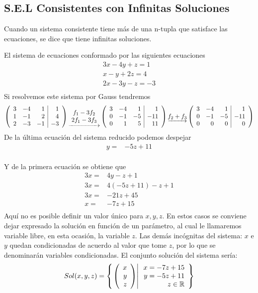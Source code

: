 \subsection{S.E.L Consistentes con Infinitas Soluciones}
Cuando un sistema consistente tiene más de una n-tupla que satisface las ecuaciones, se dice que tiene infinitas soluciones.

\begin{ejemplo}
El sistema de ecuaciones conformado por las siguientes ecuaciones 
\begin{align*}
3x-4y+z=1\\
x-y+2z=4\\
2x-3y-z=-3\\
\end{align*}
Si resolvemos este sistema por Gauss tendremos
\begin{align*}
\reducir{rrr|r}{
3&-4&1&1\\
1&-1&2&4\\
2&-3&-1&-3\\
}
\underrightarrow{\begin{array}{c}
    f_1 - 3f_2\\
    2f_1 - 3f_3
\end{array}}
\reducir{rrr|r}{
3&-4&1&1\\
0&-1&-5&-11\\
0&1&5&11\\
}
\underrightarrow{f_2 + f_3}
\reducir{rrr|r}{
3&-4&1&1\\
0&-1&-5&-11\\
0&0&0&0\\
}
\end{align*}
De la última ecuación del sistema reducido podemos despejar 
\begin{align*}
y=&-5z+11\\
\end{align*}

Y de la primera ecuación se obtiene que
\begin{align*}
3x=&4y-z+1\\
3x=&4(-5z+11)-z+1\\
3x=&-21z+45\\
x=&-7z+15\\
\end{align*}
Aquí no es posible definir un valor único para $x, y, z$. En estos casos se conviene dejar expresado la solución en función de un parámetro, al cual le llamaremos variable libre, en esta ocasión, la variable $z$. Las demás incógnitas del sistema: $x$ e $y$ quedan condicionadas de acuerdo al valor que tome $z$, por lo que se denominarán variables condicionadas. El conjunto solución del sistema sería:
\begin{align*}
Sol(x,y, z)=\llaves{\vectrtres{x}{y}{z}}{\begin{array}{r}x=-7z+15\\y=-5z+11\\z\in \dobler
\end{array}}
\end{align*}

\end{ejemplo}

